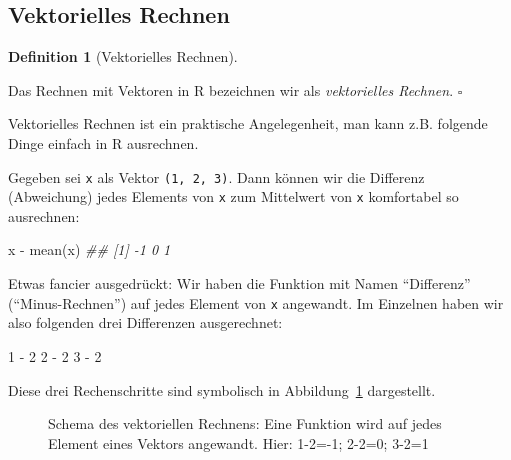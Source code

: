 \documentclass[
  letterpaper,
]{scrbook}
\newenvironment{Shaded}{\begin{snugshade}}{\end{snugshade}}
\newcommand{\DecValTok}[1]{\textcolor[rgb]{0.68,0.00,0.00}{#1}}
\newcommand{\DocumentationTok}[1]{\textcolor[rgb]{0.37,0.37,0.37}{\textit{#1}}}
\newcommand{\FunctionTok}[1]{\textcolor[rgb]{0.28,0.35,0.67}{#1}}
\newcommand{\NormalTok}[1]{\textcolor[rgb]{0.00,0.23,0.31}{#1}}
\newcommand{\SpecialCharTok}[1]{\textcolor[rgb]{0.37,0.37,0.37}{#1}}
\theoremstyle{definition}
\theoremstyle{definition}
\newtheorem{definition}{Definition}[chapter]
\theoremstyle{definition}
\theoremstyle{remark}
\begin{document}
\subsection{Vektorielles Rechnen}\label{sec-veccalc}

\begin{definition}[Vektorielles
Rechnen]\protect\hypertarget{def-veccalc}{}\label{def-veccalc}

Das Rechnen mit Vektoren in R bezeichnen wir als \emph{vektorielles
Rechnen}. \(\square\)

\end{definition}

Vektorielles Rechnen ist ein praktische Angelegenheit, man kann z.B.
folgende Dinge einfach in R ausrechnen.

Gegeben sei \texttt{x} als Vektor \texttt{(1,\ 2,\ 3)}. Dann können wir
die Differenz (Abweichung) jedes Elements von \texttt{x} zum Mittelwert
von \texttt{x} komfortabel so ausrechnen:

\begin{Shaded}
\begin{Highlighting}[]
\NormalTok{x }\SpecialCharTok{{-}} \FunctionTok{mean}\NormalTok{(x)}
\DocumentationTok{\#\# [1] {-}1  0  1}
\end{Highlighting}
\end{Shaded}

Etwas fancier ausgedrückt: Wir haben die Funktion mit Namen
``Differenz'' (``Minus-Rechnen'') auf jedes Element von \texttt{x}
angewandt. Im Einzelnen haben wir also folgenden drei Differenzen
ausgerechnet:

\begin{Shaded}
\begin{Highlighting}[]
\DecValTok{1} \SpecialCharTok{{-}} \DecValTok{2}
\DecValTok{2} \SpecialCharTok{{-}} \DecValTok{2}
\DecValTok{3} \SpecialCharTok{{-}} \DecValTok{2}
\end{Highlighting}
\end{Shaded}

Diese drei Rechenschritte sind symbolisch in
Abbildung~\ref{fig-vektoriell} dargestellt.

\begin{figure}


\caption{\label{fig-vektoriell}Schema des vektoriellen Rechnens: Eine
Funktion wird auf jedes Element eines Vektors angewandt. Hier: 1-2=-1;
2-2=0; 3-2=1}

\end{figure}%
\end{document}
